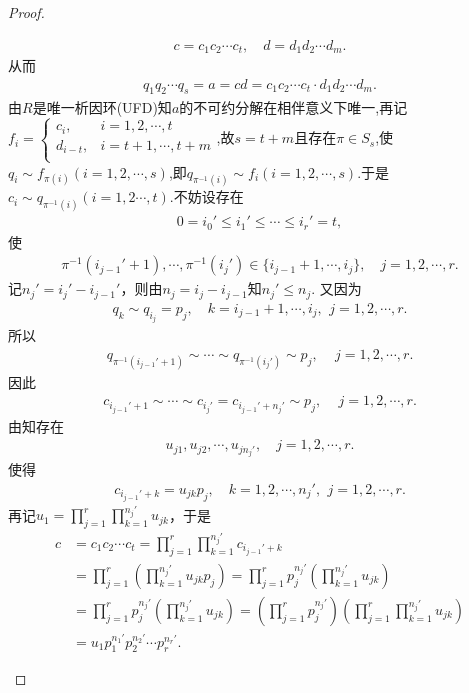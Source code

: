 \documentclass[../../main.tex]{subfiles}%
\begin{document}
\begin{proof}
\begin{enumerate}[(1)]
\begin{gather*}
c=c_1c_2\cdots c_t,
\quad
d=d_1d_2\cdots d_m.
\end{gather*}
从而
\begin{align*}
q_1q_2\cdots q_s=a=cd=c_1c_2\cdots c_t\cdot d_1d_2\cdots d_m.
\end{align*}
由$R$是唯一析因环(UFD)知$a$的不可约分解在相伴意义下唯一,再记$f_i=\begin{cases}
c_i,&i=1,2,\cdots ,t\\
d_{i-t},&i=t+1,\cdots ,t+m\\
\end{cases}$,故$s=t+m$且存在$\pi \in S_{s}$,使$q_i\sim f_{\pi \left( i \right)}(i=1,2,\cdots,s)$,即$q_{\pi^{-1}(i)}\sim f_{i}(i=1,2,\cdots,s).$于是$c_i\sim q_{\pi^{-1}(i)}(i=1,2\cdots,t).$不妨设存在
\begin{align*}
0 = i_{0}' \leqslant i_{1}' \leqslant \cdots \leqslant i_{r}' = t,
\end{align*}
使
\begin{align*}
\pi^{-1}(i_{j-1}'+1), \cdots, \pi^{-1}(i_{j}') \in \{i_{j-1}+1, \cdots, i_j\}, \quad j = 1, 2, \cdots, r.
\end{align*}
记$n_{j}' = i_{j}' - i_{j-1}'$，则由$n_j = i_j - i_{j-1}$知$n_{j}' \leqslant n_j$. 又因为
\begin{align*}
q_k \sim q_{i_j} = p_j, \quad k = i_{j-1}+1, \cdots, i_j,\ \, j = 1, 2, \cdots, r.
\end{align*}
所以
\begin{align*}
q_{\pi^{-1}(i_{j-1}'+1)} \sim \cdots \sim q_{\pi^{-1}(i_{j}')} \sim p_j, \quad \, j = 1, 2, \cdots, r.
\end{align*}
因此
\begin{align*}
c_{i_{j-1}'+1} \sim \cdots \sim c_{i_{j}'} = c_{i_{j-1}'+n_{j}'} \sim p_j, \quad \, j = 1, 2, \cdots, r.
\end{align*}
由知存在
\begin{align*}
u_{j1}, u_{j2}, \cdots, u_{jn_{j}'}, \quad j = 1, 2, \cdots, r.
\end{align*}
使得
\begin{align*}
c_{i_{j-1}'+k} = u_{jk}p_j, \quad k = 1, 2, \cdots, n_{j}',\ \, j = 1, 2, \cdots, r.
\end{align*}
再记$u_1 = \prod\limits_{j=1}^r{\prod\limits_{k=1}^{n_{j}'}{u_{jk}}}$，于是
\begin{align*}
c &= c_1c_2\cdots c_t = \prod\limits_{j=1}^r{\prod\limits_{k=1}^{n_{j}'}{c_{i_{j-1}'+k}}} \\
&= \prod\limits_{j=1}^r{\left( \prod\limits_{k=1}^{n_{j}'}{u_{jk}p_j} \right)} = \prod\limits_{j=1}^r{p_{j}^{n_{j}'}\left( \prod\limits_{k=1}^{n_{j}'}{u_{jk}} \right)} \\
&= \prod\limits_{j=1}^r{p_{j}^{n_{j}'}\left( \prod\limits_{k=1}^{n_{j}'}{u_{jk}} \right)} = \left( \prod\limits_{j=1}^r{p_{j}^{n_{j}'}} \right) \left( \prod\limits_{j=1}^r{\prod\limits_{k=1}^{n_{j}'}{u_{jk}}} \right) \\
&= u_1p_{1}^{n_{1}'}p_{2}^{n_{2}'}\cdots p_{r}^{n_{r}'}.
\end{align*}


\end{enumerate}
\end{proof}
\end{document}
